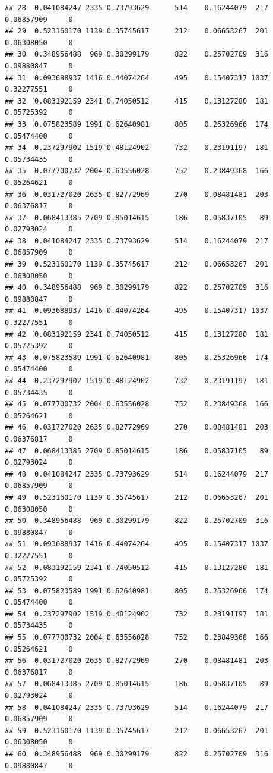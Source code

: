 \documentclass[
]{article}
\begin{document}
\begin{verbatim}
## 28  0.041084247 2335 0.73793629      514    0.16244079  217 0.06857909     0
## 29  0.523160170 1139 0.35745617      212    0.06653267  201 0.06308050     0
## 30  0.348956488  969 0.30299179      822    0.25702709  316 0.09880847     0
## 31  0.093688937 1416 0.44074264      495    0.15407317 1037 0.32277551     0
## 32  0.083192159 2341 0.74050512      415    0.13127280  181 0.05725392     0
## 33  0.075823589 1991 0.62640981      805    0.25326966  174 0.05474400     0
## 34  0.237297902 1519 0.48124902      732    0.23191197  181 0.05734435     0
## 35  0.077700732 2004 0.63556028      752    0.23849368  166 0.05264621     0
## 36  0.031727020 2635 0.82772969      270    0.08481481  203 0.06376817     0
## 37  0.068413385 2709 0.85014615      186    0.05837105   89 0.02793024     0
## 38  0.041084247 2335 0.73793629      514    0.16244079  217 0.06857909     0
## 39  0.523160170 1139 0.35745617      212    0.06653267  201 0.06308050     0
## 40  0.348956488  969 0.30299179      822    0.25702709  316 0.09880847     0
## 41  0.093688937 1416 0.44074264      495    0.15407317 1037 0.32277551     0
## 42  0.083192159 2341 0.74050512      415    0.13127280  181 0.05725392     0
## 43  0.075823589 1991 0.62640981      805    0.25326966  174 0.05474400     0
## 44  0.237297902 1519 0.48124902      732    0.23191197  181 0.05734435     0
## 45  0.077700732 2004 0.63556028      752    0.23849368  166 0.05264621     0
## 46  0.031727020 2635 0.82772969      270    0.08481481  203 0.06376817     0
## 47  0.068413385 2709 0.85014615      186    0.05837105   89 0.02793024     0
## 48  0.041084247 2335 0.73793629      514    0.16244079  217 0.06857909     0
## 49  0.523160170 1139 0.35745617      212    0.06653267  201 0.06308050     0
## 50  0.348956488  969 0.30299179      822    0.25702709  316 0.09880847     0
## 51  0.093688937 1416 0.44074264      495    0.15407317 1037 0.32277551     0
## 52  0.083192159 2341 0.74050512      415    0.13127280  181 0.05725392     0
## 53  0.075823589 1991 0.62640981      805    0.25326966  174 0.05474400     0
## 54  0.237297902 1519 0.48124902      732    0.23191197  181 0.05734435     0
## 55  0.077700732 2004 0.63556028      752    0.23849368  166 0.05264621     0
## 56  0.031727020 2635 0.82772969      270    0.08481481  203 0.06376817     0
## 57  0.068413385 2709 0.85014615      186    0.05837105   89 0.02793024     0
## 58  0.041084247 2335 0.73793629      514    0.16244079  217 0.06857909     0
## 59  0.523160170 1139 0.35745617      212    0.06653267  201 0.06308050     0
## 60  0.348956488  969 0.30299179      822    0.25702709  316 0.09880847     0

\end{verbatim}
\end{document}
